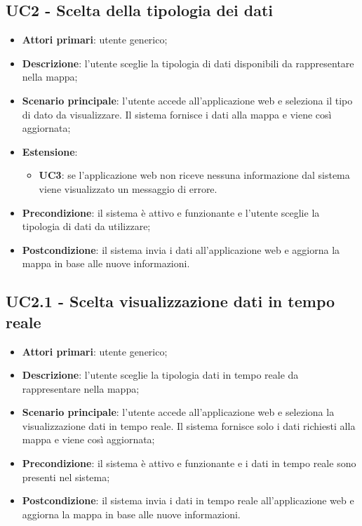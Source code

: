 \subsection{UC2 - Scelta della tipologia dei dati}
\begin{itemize}
	\item \textbf{Attori primari}: utente generico;
\item \textbf{Descrizione}: l'utente sceglie la tipologia di dati disponibili da rappresentare nella mappa;
\item \textbf{Scenario principale}: l'utente accede all'applicazione web e seleziona il tipo di dato da visualizzare. Il sistema fornisce i dati alla mappa e viene così aggiornata;
\item \textbf{Estensione}: 
\begin{itemize}
	\item \textbf{UC3}: se l'applicazione web non riceve nessuna informazione dal sistema viene visualizzato un messaggio di errore.
\end{itemize}
\item \textbf{Precondizione}: il sistema è attivo e funzionante e l'utente sceglie la tipologia di dati da utilizzare;
\item \textbf{Postcondizione}: il sistema invia i dati all'applicazione web e aggiorna la mappa in base alle nuove informazioni.
\end{itemize}

\subsection{UC2.1 - Scelta visualizzazione dati in tempo reale}
\begin{itemize}
	\item \textbf{Attori primari}: utente generico;
	\item \textbf{Descrizione}: l'utente sceglie la tipologia dati in tempo reale da rappresentare nella mappa;
	\item \textbf{Scenario principale}: l'utente accede all'applicazione web e seleziona la visualizzazione dati in tempo reale. Il sistema fornisce solo i dati richiesti alla mappa e viene così aggiornata;
	\item \textbf{Precondizione}: il sistema è attivo e funzionante e i dati in tempo reale sono presenti nel sistema;
	\item \textbf{Postcondizione}: il sistema invia i dati in tempo reale all'applicazione web e aggiorna la mappa in base alle nuove informazioni.
\end{itemize}

